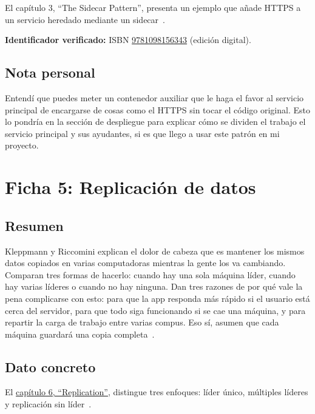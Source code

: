 \documentclass[12pt,a4paper]{article}
\begin{document}
El capítulo 3, ``The Sidecar Pattern'', presenta un ejemplo que añade HTTPS a un servicio heredado mediante un sidecar~\cite{burns2024}.

\textbf{Identificador verificado:} ISBN \href{https://www.oreilly.com/library/view/designing-distributed-systems/9781098156343/}{9781098156343} (edición digital).

\subsection*{Nota personal}

Entendí que puedes meter un contenedor auxiliar que le haga el favor al servicio principal de encargarse de cosas como el HTTPS sin tocar el código original. Esto lo pondría en la sección de despliegue para explicar cómo se dividen el trabajo el servicio principal y sus ayudantes, si es que llego a usar este patrón en mi proyecto.

\section*{Ficha 5: Replicación de datos}

\subsection*{Resumen}

Kleppmann y Riccomini explican el dolor de cabeza que es mantener los mismos datos copiados en varias computadoras mientras la gente los va cambiando. Comparan tres formas de hacerlo: cuando hay una sola máquina líder, cuando hay varias líderes o cuando no hay ninguna. Dan tres razones de por qué vale la pena complicarse con esto: para que la app responda más rápido si el usuario está cerca del servidor, para que todo siga funcionando si se cae una máquina, y para repartir la carga de trabajo entre varias compus. Eso sí, asumen que cada máquina guardará una copia completa~\cite{kleppmann2026}.

\subsection*{Dato concreto}

El \href{https://www.oreilly.com/library/view/designing-data-intensive-applications/9781098119058/ch06.html}{capítulo 6, ``Replication''}, distingue tres enfoques: líder único, múltiples líderes y replicación sin líder~\cite{kleppmann2026}.
\end{document}
